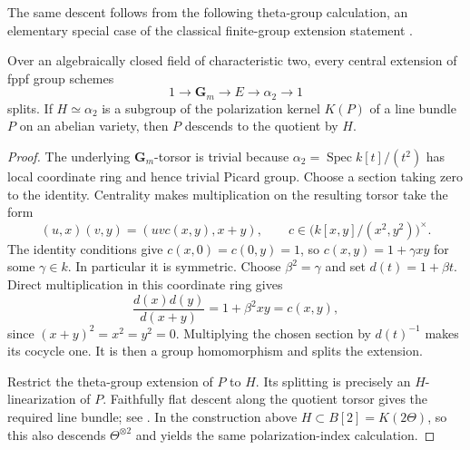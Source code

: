 The same descent follows from the following theta-group calculation, an elementary special case of the classical finite-group extension statement \citep[Fact~8.7, p.~115]{EGM}.

\begin{lemma}\label{lem:alpha-two-theta-descent}
Over an algebraically closed field of characteristic two, every central extension of fppf group schemes
\[
                  1\longrightarrow\mathbf G_m\longrightarrow E
                   \longrightarrow\alpha_2\longrightarrow1
\]
splits. If $H\simeq\alpha_2$ is a subgroup of the polarization kernel $K(P)$ of a line bundle $P$ on an abelian variety, then $P$ descends to the quotient by $H$.
\end{lemma}
\begin{proof}
The underlying $\mathbf G_m$-torsor is trivial because $\alpha_2=\operatorname{Spec}k[t]/(t^2)$ has local coordinate ring and hence trivial Picard group. Choose a section taking zero to the identity. Centrality makes multiplication on the resulting torsor take the form
\[
        (u,x)(v,y)=(uvc(x,y),x+y),\qquad
 c\in\bigl(k[x,y]/(x^2,y^2)\bigr)^\times.
\]
The identity conditions give $c(x,0)=c(0,y)=1$, so $c(x,y)=1+\gamma xy$ for some $\gamma\in k$. In particular it is symmetric. Choose $\beta^2=\gamma$ and set $d(t)=1+\beta t$. Direct multiplication in this coordinate ring gives
\[
                \frac{d(x)d(y)}{d(x+y)}=1+\beta^2xy=c(x,y),
\]
since $(x+y)^2=x^2=y^2=0$. Multiplying the chosen section by $d(t)^{-1}$ makes its cocycle one. It is then a group homomorphism and splits the extension.

Restrict the theta-group extension of $P$ to $H$. Its splitting is precisely an $H$-linearization of $P$. Faithfully flat descent along the quotient torsor gives the required line bundle; see \citet[Theorem~8.10 and its proof, p.~116]{EGM}. In the construction above $H\subset B[2]=K(2\Theta)$, so this also descends $\Theta^{\otimes2}$ and yields the same polarization-index calculation.
\end{proof}
